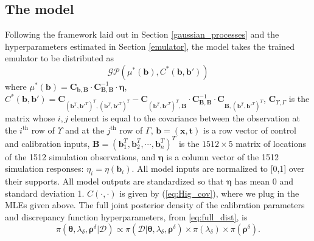 \documentclass{article}
\begin{document}
\subsection{The model}\label{the_model}
Following the framework laid out in Section \ref{gaussian_processes} and the hyperparameters estimated in Section \ref{emulator}, the model takes the trained emulator to be distributed as
%
\begin{equation}\label{posterior_GP}
\mathcal {GP}\left(\mu^*(\mathbf b), C^*(\mathbf b,\mathbf b')\right)
\end{equation}
%
where $\mu^*(\mathbf b) = \mathbf C_{\mathbf b,\mathbf B} \cdot \mathbf C_{\mathbf B,\mathbf B}^{-1} \cdot \boldsymbol \eta$, $C^*(\mathbf b,\mathbf b') = \mathbf C_{(\mathbf b^T,\mathbf b'^T)^T,(\mathbf b^T,\mathbf b'^T)^T} - \mathbf C_{(\mathbf b^T,\mathbf b'^T)^T,\mathbf B}\cdot \mathbf C_{\mathbf B,\mathbf B}^{-1} \cdot \mathbf C_{\mathbf B,(\mathbf b^T,\mathbf b'^T)^T}$, $\mathbf C_{\Upsilon,\Gamma}$ is the matrix whose $i,j$ element is equal to the covariance between the observation at the $i^{\text{th}}$ row of $\Upsilon$ and at the $j^{\text{th}}$ row of $\Gamma$, $\mathbf b=(\mathbf x,\mathbf t)$ is a row vector of control and calibration inputs, $\mathbf B=(\mathbf b_1^T,\mathbf b_2^T,\cdots,\mathbf b_n^T)^T$ is the $1512\times5$ matrix of locations of the 1512 simulation observations, and $\boldsymbol\eta$ is a column vector of the 1512 simulation responses: $\eta_i=\eta(\mathbf b_i)$. 
%
All model inputs are normalized to [0,1] over their supports. All model outputs are standardized so that $\boldsymbol\eta$ has mean 0 and standard deviation 1.
%
$C(\cdot,\cdot)$ is given by (\ref{eq:Hig_cov}), where we plug in the MLEs given above. 
%
The full joint posterior density of the calibration parameters and discrepancy function hyperparameters, from \eqref{eq:full_dist}, is
\begin{equation} \label{eq:wt_full_dist}
\pi(\boldsymbol\theta,\lambda_\delta,\boldsymbol\rho^\delta|\mathcal D) 
\propto 
\pi(\mathcal D|\boldsymbol\theta,\lambda_\delta,\boldsymbol\rho^\delta)
\times
\pi(\lambda_\delta)
\times
\pi(\boldsymbol\rho^\delta).
\end{equation}
%
\end{document}
